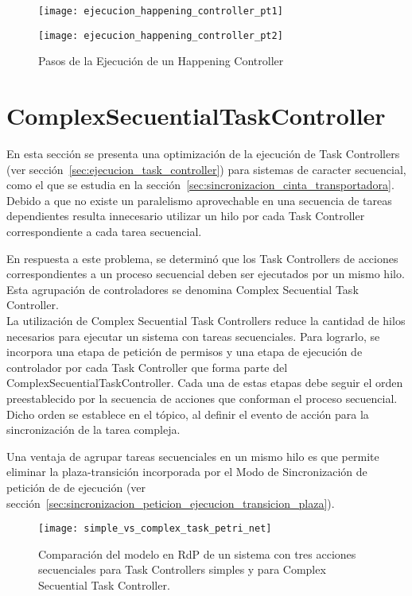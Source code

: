 \begin{figure}[H]
	\centering
	\texttt{[image: ejecucion\_happening\_controller\_pt1]}
\end{figure}
\begin{figure}[H]
	\centering
	\texttt{[image: ejecucion\_happening\_controller\_pt2]}
	\caption{Pasos de la Ejecución de un Happening Controller}
	\label{fig:ejecucion_happening_controller}
\end{figure}

\section{ComplexSecuentialTaskController}
\label{sec:complex_secuential_task_controller}
En esta sección se presenta una optimización de la ejecución de Task Controllers
(ver sección~\ref{sec:ejecucion_task_controller}) para sistemas de caracter
secuencial, como el que se estudia en la
sección~\ref{sec:sincronizacion_cinta_transportadora}.
Debido a que no existe un paralelismo aprovechable en una secuencia de
tareas dependientes resulta innecesario utilizar un hilo
por cada Task Controller correspondiente a cada tarea secuencial.

En respuesta a este problema, se determinó que los Task Controllers de acciones
correspondientes a un proceso secuencial deben ser ejecutados por un mismo hilo.
Esta agrupación de controladores se denomina Complex Secuential Task
Controller.
\\
La utilización de Complex Secuential Task Controllers reduce la
cantidad de hilos necesarios para ejecutar un sistema con tareas secuenciales.
Para lograrlo, se incorpora una etapa de petición de permisos y una etapa de
ejecución de controlador por cada Task Controller que forma parte del
ComplexSecuentialTaskController. Cada una de estas etapas debe seguir el orden
preestablecido por la secuencia de acciones que conforman el proceso secuencial.
Dicho orden se establece en el tópico, al definir el evento de acción para la
sincronización de la tarea compleja.

Una ventaja de agrupar tareas secuenciales en un mismo hilo es que permite
eliminar la plaza-transición incorporada por el Modo de Sincronización de
petición de de ejecución (ver sección~\ref{sec:sincronizacion_peticion_ejecucion_transicion_plaza}).

\begin{figure}[H]
	\centering
	\texttt{[image: simple\_vs\_complex\_task\_petri\_net]}
	\caption{Comparación del modelo en RdP de un sistema con tres
	acciones secuenciales para Task Controllers simples y para Complex Secuential
	Task Controller.}
	\label{fig:simple_task_vs_complex_task_petri_net}
\end{figure}

